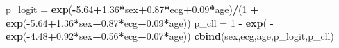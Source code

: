 \documentclass[]{article}
\newenvironment{Shaded}{\begin{snugshade}}{\end{snugshade}}
\newcommand{\KeywordTok}[1]{\textcolor[rgb]{0.13,0.29,0.53}{\textbf{#1}}}
\newcommand{\DecValTok}[1]{\textcolor[rgb]{0.00,0.00,0.81}{#1}}
\newcommand{\FloatTok}[1]{\textcolor[rgb]{0.00,0.00,0.81}{#1}}
\newcommand{\StringTok}[1]{\textcolor[rgb]{0.31,0.60,0.02}{#1}}
\newcommand{\OperatorTok}[1]{\textcolor[rgb]{0.81,0.36,0.00}{\textbf{#1}}}
\newcommand{\NormalTok}[1]{#1}
\begin{document}
\begin{Shaded}
\begin{Highlighting}[]
\NormalTok{p_logit =}\StringTok{ }\KeywordTok{exp}\NormalTok{(}\OperatorTok{-}\FloatTok{5.64}\OperatorTok{+}\FloatTok{1.36}\OperatorTok{*}\NormalTok{sex}\OperatorTok{+}\FloatTok{0.87}\OperatorTok{*}\NormalTok{ecg}\OperatorTok{+}\FloatTok{0.09}\OperatorTok{*}\NormalTok{age)}\OperatorTok{/}\NormalTok{(}\DecValTok{1} \OperatorTok{+}\StringTok{ }\KeywordTok{exp}\NormalTok{(}\OperatorTok{-}\FloatTok{5.64}\OperatorTok{+}\FloatTok{1.36}\OperatorTok{*}\NormalTok{sex}\OperatorTok{+}\FloatTok{0.87}\OperatorTok{*}\NormalTok{ecg}\OperatorTok{+}\FloatTok{0.09}\OperatorTok{*}\NormalTok{age))}
\NormalTok{p_cll =}\StringTok{ }\DecValTok{1} \OperatorTok{-}\StringTok{ }\KeywordTok{exp}\NormalTok{( }\OperatorTok{-}\KeywordTok{exp}\NormalTok{(}\OperatorTok{-}\FloatTok{4.48}\OperatorTok{+}\FloatTok{0.92}\OperatorTok{*}\NormalTok{sex}\OperatorTok{+}\FloatTok{0.56}\OperatorTok{*}\NormalTok{ecg}\OperatorTok{+}\FloatTok{0.07}\OperatorTok{*}\NormalTok{age))}
\KeywordTok{cbind}\NormalTok{(sex,ecg,age,p_logit,p_cll)}
\end{Highlighting}
\end{Shaded}
\end{document}

